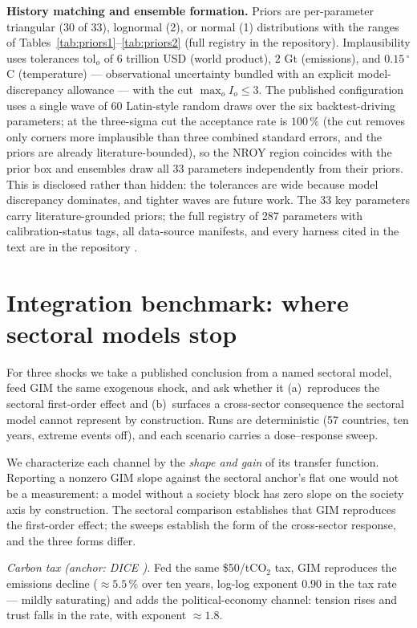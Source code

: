 \documentclass[a4paper,fleqn]{cas-sc}
\begin{document}
\textbf{History matching and ensemble formation.} Priors are per-parameter triangular (30 of
33), lognormal (2), or normal (1) distributions with the ranges of
Tables~\ref{tab:priors1}--\ref{tab:priors2} (full registry in the repository). Implausibility
uses tolerances $\mathrm{tol}_o$ of $6$ trillion USD (world product), $2$ Gt (emissions), and
$0.15\,^{\circ}$C (temperature) --- observational uncertainty bundled with an explicit
model-discrepancy allowance --- with the cut $\max_o I_o \le 3$. The published configuration
uses a single wave of $60$ Latin-style random draws over the six backtest-driving parameters;
at the three-sigma cut the acceptance rate is $100\,\%$ (the cut removes only corners more
implausible than three combined standard errors, and the priors are already
literature-bounded), so the NROY region coincides with the prior box and ensembles draw all 33
parameters independently from their priors. This is disclosed rather than hidden: the
tolerances are wide because model discrepancy dominates, and tighter waves are future work.
The 33 key parameters carry literature-grounded priors; the full registry of 287 parameters
with calibration-status tags, all data-source manifests, and every harness cited in the text
are in the repository \citep{theclimateguy2026gim}.

\clearpage
\section{Integration benchmark: where sectoral models stop}
\label{app:benchmark}

For three shocks we take a published conclusion from a named sectoral model, feed GIM the same
exogenous shock, and ask whether it (a)~reproduces the sectoral first-order effect and
(b)~surfaces a cross-sector consequence the sectoral model cannot represent by construction.
Runs are deterministic (57 countries, ten years, extreme events off), and each scenario carries a
dose--response sweep.

We characterize each channel by the \emph{shape and gain} of its transfer function. Reporting a
nonzero GIM slope against the sectoral anchor's flat one would not be a measurement: a model
without a society block has zero slope on the society axis by construction. The sectoral
comparison establishes that GIM reproduces the first-order effect; the sweeps establish the form
of the cross-sector response, and the three forms differ.

\emph{Carbon tax (anchor: DICE \cite{nordhaus2017}).} Fed the same \$50/tCO$_2$ tax, GIM
reproduces the emissions decline (${\approx}5.5\,\%$ over ten years, log-log exponent $0.90$ in
the tax rate --- mildly saturating) and adds the political-economy channel: tension rises and
trust falls in the rate, with exponent ${\approx}1.8$.
\end{document}
